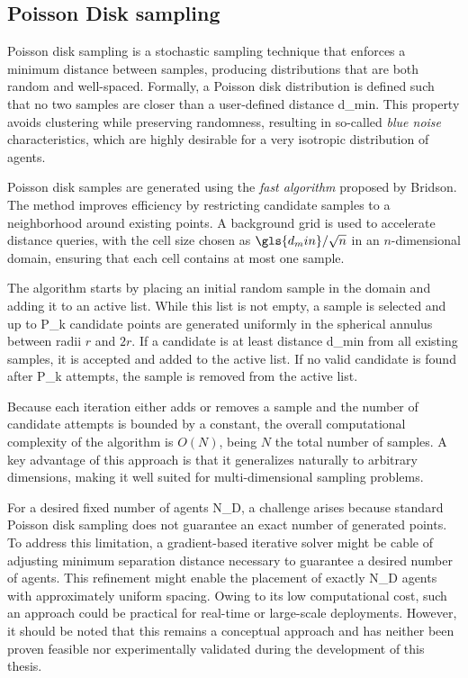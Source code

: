 \subsection{Poisson Disk sampling} \label{sec.3:Poisson sampling disk}

Poisson disk sampling is a stochastic sampling technique that enforces a minimum distance between samples, producing distributions that are both random and well-spaced. Formally, a Poisson disk distribution is defined such that no two samples are closer than a user-defined distance \gls{d_min}. This property avoids clustering while preserving randomness, resulting in so-called \emph{blue noise} characteristics, which are highly desirable for a very isotropic distribution of agents.

Poisson disk samples are generated using the \textit{fast algorithm} proposed by Bridson\cite{poisson_sampling_disk}. The method improves efficiency by restricting candidate samples to a neighborhood around existing points. A background grid is used to accelerate distance queries, with the cell size chosen as \( \gls{d_min} / \sqrt{n} \) in an \( n \)-dimensional domain, ensuring that each cell contains at most one sample.

The algorithm starts by placing an initial random sample in the domain and adding it to an active list. While this list is not empty, a sample is selected and up to \gls{P_k} candidate points are generated uniformly in the spherical annulus between radii \( r \) and \( 2r \). If a candidate is at least distance \gls{d_min} from all existing samples, it is accepted and added to the active list. If no valid candidate is found after \gls{P_k} attempts, the sample is removed from the active list.

Because each iteration either adds or removes a sample and the number of candidate attempts is bounded by a constant, the overall computational complexity of the algorithm is \( O(N) \), being \( N \) the total number of samples. A key advantage of this approach is that it generalizes naturally to arbitrary dimensions, making it well suited for multi-dimensional sampling problems.

For a desired fixed number of agents \gls{N_D}, a challenge arises because standard Poisson disk sampling does not guarantee an exact number of generated points. To address this limitation, a gradient-based iterative solver might be cable of adjusting minimum separation distance necessary to guarantee a desired number of agents. This refinement might enable the placement of exactly \gls{N_D} agents with approximately uniform spacing. Owing to its low computational cost, such an approach could be practical for real-time or large-scale deployments. However, it should be noted that this remains a conceptual approach and has neither been proven feasible nor experimentally validated during the development of this thesis.

